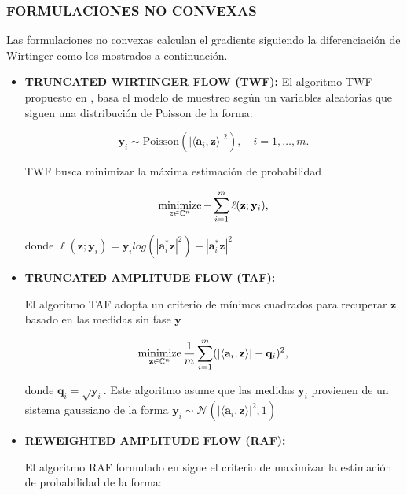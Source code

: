 \subsubsection{FORMULACIONES NO CONVEXAS}
Las formulaciones no convexas calculan el gradiente siguiendo la diferenciación de Wirtinger como los mostrados a continuación.
\begin{itemize}
    \item \textbf{TRUNCATED WIRTINGER FLOW (TWF):}
    El algoritmo TWF propuesto en \cite{chen2017solving}, basa el modelo de muestreo según un variables aleatorias que siguen una distribución de Poisson de la forma:
    
    \begin{equation}
        \mathbf{y}_i \sim \mathrm{Poisson}( \vert \langle \mathbf{a}_i,\mathbf{z}\rangle \vert^2 ), \quad i=1,\dots,m.
    \end{equation}
    
    TWF busca minimizar la máxima estimación de probabilidad 
    
    \begin{equation}
        \operatorname*{minimize}_{z \in \mathbb{C}^{n}} - \sum_{i=1}^{m} \ell(\mathbf{z};\mathbf{y}_i),
    \end{equation}
    
    donde $\ell(\mathbf{z};\mathbf{y}_i) = { \mathbf{y}_i log(|\mathbf{a}_i^* \mathbf{z}|^2) -|\mathbf{a}_i^* \mathbf{z}|^2 }$ 
    
    \item \textbf{TRUNCATED AMPLITUDE FLOW (TAF):}

    El algoritmo TAF \cite{wang2017solving} adopta un criterio de mínimos cuadrados para recuperar $\mathbf{z}$ basado en las medidas sin fase $\mathbf{y}$ 
    
    \begin{equation}
        \operatorname*{minimize}_{\mathbf{z} \in \mathbb{C}^{n}} \frac{1}{m} \sum_{i=1}^{m} (\vert \langle \mathbf{a}_i,\mathbf{z}\rangle \vert - \mathbf{q}_i)^2,
    \end{equation}
    
    donde $\mathbf{q}_i = \sqrt{\mathbf{y}_i}$. Este algoritmo asume que las medidas $\mathbf{y}_i$ provienen de un sistema gaussiano de la forma $\mathbf{y}_i \sim \mathcal{N}(\vert \langle \mathbf{a}_i,\mathbf{z}\rangle \vert^2, 1)$
    
    \item \textbf{REWEIGHTED AMPLITUDE FLOW (RAF):}

    El algoritmo RAF formulado en \cite{wang2018phase} sigue el criterio de maximizar la estimación de probabilidad de la forma:
    

\end{itemize}
